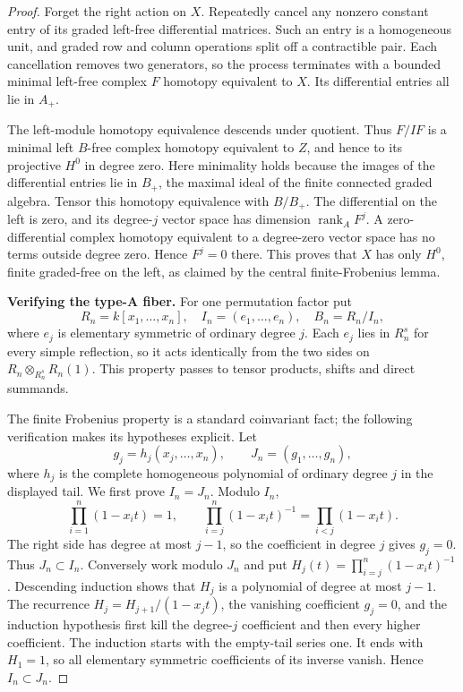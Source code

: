 \begin{proof}
Forget the right action on \(X\). Repeatedly cancel any nonzero
constant entry of its graded left-free differential matrices.
Such an entry is a homogeneous unit, and graded row and column
operations split off a contractible pair. Each cancellation
removes two generators, so the process terminates with a bounded
minimal left-free complex \(F\) homotopy equivalent to \(X\).
Its differential entries all lie in \(A_+\).

The left-module homotopy equivalence descends under quotient.
Thus \(F/IF\) is a minimal left \(B\)-free complex homotopy
equivalent to \(Z\), and hence to its projective \(H^0\) in
degree zero. Here minimality holds because the images of the
differential entries lie in \(B_+\), the maximal ideal of the
finite connected graded algebra. Tensor this homotopy
equivalence with \(B/B_+\). The differential on the left is
zero, and its degree-\(j\) vector space has dimension
\(\operatorname{rank}_A F^j\). A zero-differential complex
homotopy equivalent to a degree-zero vector space has no terms
outside degree zero. Hence \(F^j=0\) there. This proves that
\(X\) has only \(H^0\), finite graded-free on the left, as
claimed by the central finite-Frobenius lemma.

\par\smallskip\noindent\textbf{Verifying the type-A fiber.}\quad
For one permutation factor put
\[
 R_n=k[x_1,\ldots,x_n],\quad
 I_n=(e_1,\ldots,e_n),\quad B_n=R_n/I_n,
\]
where \(e_j\) is elementary symmetric of ordinary degree \(j\).
Each \(e_j\) lies in \(R_n^s\) for every simple reflection,
so it acts identically from the two sides on
\(R_n\otimes_{R_n^s}R_n(1)\). This property passes to
tensor products, shifts and direct summands.

The finite Frobenius property is a standard coinvariant fact;
the following verification makes its hypotheses explicit.
Let
\[
 g_j=h_j(x_j,\ldots,x_n),\qquad J_n=(g_1,\ldots,g_n),
\]
where \(h_j\) is the complete homogeneous polynomial of
ordinary degree \(j\) in the displayed tail. We first prove
\(I_n=J_n\). Modulo \(I_n\),
\[
 \prod_{i=1}^n(1-x_it)=1,
 \qquad
 \prod_{i=j}^n(1-x_it)^{-1}=\prod_{i<j}(1-x_it).
\]
The right side has degree at most \(j-1\), so the coefficient
in degree \(j\) gives \(g_j=0\). Thus \(J_n\subset I_n\).
Conversely work modulo \(J_n\) and put
\(H_j(t)=\prod_{i=j}^n(1-x_it)^{-1}\).
Descending induction shows that \(H_j\) is a polynomial of
degree at most \(j-1\). The recurrence
\(H_j=H_{j+1}/(1-x_jt)\), the vanishing coefficient
\(g_j=0\), and the induction hypothesis first kill the
degree-\(j\) coefficient and then every higher coefficient.
The induction starts with the empty-tail series one.
It ends with \(H_1=1\), so all elementary symmetric
coefficients of its inverse vanish. Hence \(I_n\subset J_n\).


\end{proof}
